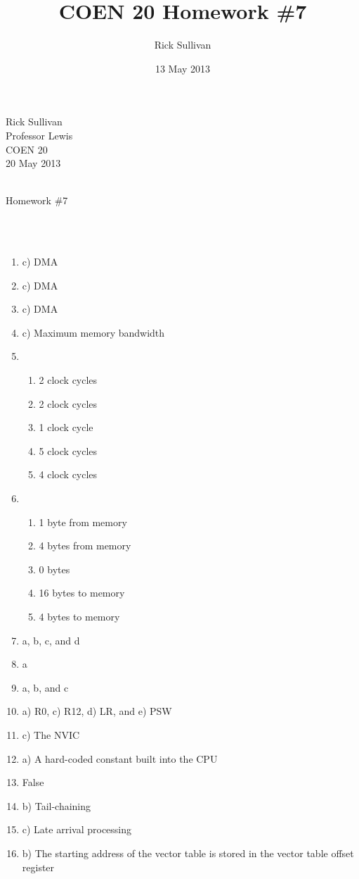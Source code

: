 \documentclass{article}
\title{COEN 20 Homework \#7}
\date{13 May 2013}
\author{Rick Sullivan}
\begin{document}
\noindent Rick Sullivan     \\
          Professor Lewis   \\
          COEN 20           \\
          20 May 2013        \\
                            \\
\centerline {Homework \#7}    \\
                            \\
\begin{enumerate}
    \item
        c) DMA
    \item
        c) DMA
    \item
        c) DMA
    \item
        c) Maximum memory bandwidth
    \item
        \begin{enumerate}
            \item   2 clock cycles
            \item   2 clock cycles
            \item   1 clock cycle
            \item   5 clock cycles
            \item   4 clock cycles
        \end{enumerate}
    \item
        \begin{enumerate}
            \item   1 byte from memory
            \item   4 bytes from memory
            \item   0 bytes
            \item   16 bytes to memory
            \item   4 bytes to memory
        \end{enumerate}
    \item a, b, c, and d
    \item a
    \item a, b, and c
    \item a) R0, c) R12, d) LR, and e) PSW
    \item c) The NVIC
    \item a) A hard-coded constant built into the CPU
    \item False
    \item b) Tail-chaining
    \item c) Late arrival processing
    \item b) The starting address of the vector table is stored in the vector table offset register

\end{enumerate}
\end{document}

